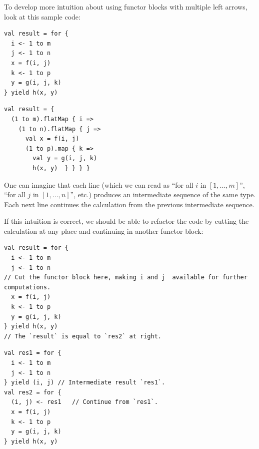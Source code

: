 To develop more intuition about using functor blocks with multiple
left arrows, look at this sample code:

\noindent \texttt{\textcolor{blue}{\footnotesize{}}}%
\begin{minipage}[c]{0.475\columnwidth}%
\texttt{\textcolor{blue}{\footnotesize{}}}
\begin{lstlisting}
val result = for {
  i <- 1 to m
  j <- 1 to n
  x = f(i, j)
  k <- 1 to p
  y = g(i, j, k)
} yield h(x, y)
\end{lstlisting}
%
\end{minipage}\texttt{\textcolor{blue}{\footnotesize{}\hspace*{\fill}}}%
\begin{minipage}[c]{0.475\columnwidth}%
\texttt{\textcolor{blue}{\footnotesize{}}}
\begin{lstlisting}
val result = {
  (1 to m).flatMap { i =>
    (1 to n).flatMap { j =>
      val x = f(i, j)
      (1 to p).map { k =>
        val y = g(i, j, k)
        h(x, y)  } } } }
\end{lstlisting}
%
\end{minipage}{\footnotesize\par}

\vspace{0.2\baselineskip}
One can imagine that each line (which we can read as \textsf{``}for all $i$
in $\left[1,...,m\right]$\textsf{''}, \textsf{``}for all $j$ in $\left[1,...,n\right]$\textsf{''},
etc.) produces an intermediate sequence of the same type. Each next
line continues the calculation from the previous intermediate sequence. 

If this intuition is correct, we should be able to refactor the code
by cutting the calculation at any place and continuing in another
functor block:

\noindent \texttt{\textcolor{blue}{\footnotesize{}}}%
\begin{minipage}[c]{0.475\columnwidth}%
\texttt{\textcolor{blue}{\footnotesize{}}}
\begin{lstlisting}
val result = for {
  i <- 1 to m
  j <- 1 to n
// Cut the functor block here, making i and j  available for further computations.
  x = f(i, j)
  k <- 1 to p
  y = g(i, j, k)
} yield h(x, y)
// The `result` is equal to `res2` at right.
\end{lstlisting}
%
\end{minipage}\texttt{\textcolor{blue}{\footnotesize{}\hspace*{\fill}}}%
\begin{minipage}[c]{0.475\columnwidth}%
\texttt{\textcolor{blue}{\footnotesize{}}}
\begin{lstlisting}
val res1 = for {
  i <- 1 to m
  j <- 1 to n
} yield (i, j) // Intermediate result `res1`.
val res2 = for {
  (i, j) <- res1   // Continue from `res1`.
  x = f(i, j)
  k <- 1 to p
  y = g(i, j, k)
} yield h(x, y)
\end{lstlisting}
%
\end{minipage}{\footnotesize\par}


